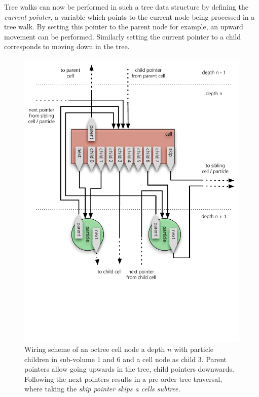 Tree walks can now be performed in such a tree data structure by defining the \emph{current pointer}, a variable which points to the current node being processed in a tree walk. By setting this pointer to the parent node for example, an upward movement can be performed. Similarly setting the current pointer to a child corresponds to moving down in the tree.
\begin{figure}[htbp]
\begin{center}
\includegraphics[scale=0.6]{11cell_wiring.pdf}
\caption{Wiring scheme of an octree cell node a depth $n$ with particle children in sub-volume 1 and 6 and a cell node as child 3. Parent pointers allow going upwards in the tree, child pointers downwards. Following the next pointers results in a pre-order tree traversal, where taking the \it{skip} pointer skips a cells subtree.}
\label{ch02_fig11}
\end{center}
\end{figure}

